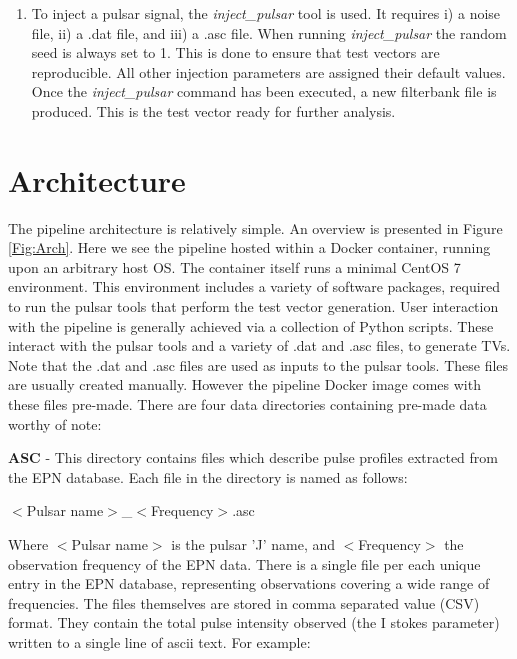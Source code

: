 \documentclass[preprint,authoryear,5p,twocolumn]{elsarticle_mod}
\begin{document}
\begin{enumerate}
\item To inject a pulsar signal, the \textit{inject\_pulsar} tool is used. It requires i) a noise file, ii) a .dat file, and iii) a .asc file. When running \textit{inject\_pulsar} the random seed is always set to 1. This is done to ensure that test vectors are reproducible. All other injection parameters are assigned their default values. Once the \textit{inject\_pulsar} command has been executed, a new filterbank file is produced. This is the test vector ready for further analysis. 
\end{enumerate}

\section{Architecture}
The pipeline architecture is relatively simple. An overview is presented in Figure \ref{Fig:Arch}. Here we see the pipeline hosted within a Docker container, running upon an arbitrary host OS. The container itself runs a minimal CentOS 7 environment. This environment includes a variety of software packages, required to run the pulsar tools that perform the test vector generation. User interaction with the pipeline is generally achieved via a collection of Python scripts. These interact with the pulsar tools and a variety of .dat and .asc files, to generate TVs. Note that the .dat and .asc files are used as inputs to the pulsar tools. These files are usually created manually. However the pipeline Docker image comes with these files pre-made. There are four data directories containing pre-made data worthy of note:\newline

\textbf{ASC} - This directory contains files which describe pulse profiles extracted from the EPN database. Each file in the directory is named as follows:\newline 

$<$Pulsar name$>$\_$<$Frequency$>$.asc \newline 

Where $<$Pulsar name$>$ is the pulsar 'J' name, and $<$Frequency$>$ the observation frequency of the EPN data. There is a single file per each unique entry in the EPN database, representing observations covering a wide range of frequencies. The files themselves are stored in comma separated value (CSV) format. They contain the total pulse intensity observed (the I stokes parameter) written to a single line of ascii text. For example:\newline
 
\end{document}
